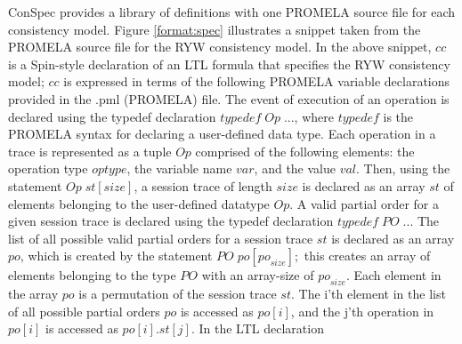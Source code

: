 \documentclass[journal,compsoc]{IEEEtran}
\begin{document}
  \par ConSpec provides a library of definitions with one PROMELA source file for each consistency model.
Figure \ref{format:spec} illustrates a snippet taken from the PROMELA  source file for the RYW consistency model. In the above snippet, $\mathit{cc}$ is a Spin-style declaration of an LTL formula that specifies the RYW consistency model; $\mathit{cc}$ is expressed in terms of the following PROMELA variable declarations provided in the .pml (PROMELA)  file. The event of execution of an operation is declared using the typedef declaration  $\mathit{typedef}\; \mathit{Op}\; ...$, where $\mathit{typedef}$ is the PROMELA syntax for declaring a user-defined data type.
Each operation in a trace is represented as a tuple  $\mathit{Op}$ comprised of the following elements: the operation type $\mathit{optype}$, the variable name $\mathit{var}$, and the value $\mathit{val}$.  Then, using the statement $\mathit{Op} \; \mathit{st}[\mathit{size}]$, a session trace of length $\mathit{size}$ is declared as an array $\mathit{st} $ of elements belonging to the user-defined datatype $\mathit{Op}$.   A valid partial order for a given session trace is declared using the typedef declaration $\mathit{typedef}\; \mathit{PO}\; ...$  The list of all possible valid partial orders for a session trace $\mathit{st}$ is declared as an array $\mathit{po}$, which is created by the statement $\mathit{PO}\; \mathit{po}[\mathit{po}_\mathit{size}];$ this creates an array of elements belonging to the type $\mathit{PO}$ with an  array-size of $\mathit{po}_\mathit{size}$. Each element in the array $\mathit{po}$ is a permutation of the session trace $\mathit{st}$. The i'th element in the list of all possible partial orders $\mathit{po}$ is accessed as $\mathit{po}[i]$, and the j'th operation in $\mathit{po}[i]$ is accessed as $\mathit{po}[i].\mathit{st}[j]$. In the LTL declaration
\end{document}
